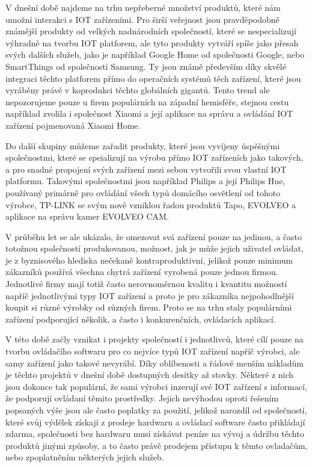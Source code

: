 V dnešní době najdeme na trhu nepřeberné množství produktů, které nám umožní interakci s IOT zařízeními. Pro širší veřejnost jsou pravděpodobně známější produkty od velkých nadnárodních společností, které se nespecializují výhradně na tvorbu IOT platforem, ale tyto produkty vytváří spíše jako přesah svých dalších služeb, jako je například Google Home od společnosti Google, nebo SmartThings od společnosti Samsung. Ty jsou známě především díky skvělé integraci těchto platforem přímo do operačních systémů těch zařízení, které jsou vyráběny právě v koprodukci těchto globálních gigantů. Tento trend ale nepozorujeme pouze u firem populárních na západní hemisféře, stejnou cestu například zvolila i společnost Xiaomi a její aplikace na správu a ovládání IOT zařízení pojmenovaná Xiaomi Home.

Do další skupiny můžeme zařadit produkty, které jsou vyvíjeny úspěšnými společnostmi, které se speializují na výrobu přímo IOT zařízeních jako takových, a pro snadné propojení svých zařízení mezi sebou vytvořili svou vlastní IOT platformu. Takovými společnostmi jsou například Philips a její Philips Hue, používaný primárně pro ovládání všech typů domácího osvětlení od tohoto výrobce, TP-LINK se svým nově vzniklou řadou produktů Tapo, EVOLVEO a aplikace na správu kamer EVOLVEO CAM.

V průběhu let se ale ukázalo, že omezovat svá zařízení pouze na jedinou, a často totožnou společností produkovanou, možnost, jak je může jejich uživatel ovládat, je z byznisového hlediska nečekaně kontraproduktivní, jelikož pouze minimum zákazníků používá všechna chytrá zařízení vyrobená pouze jednou firmou. Jednotlivé firmy mají totiž často nerovnoměrnou kvalitu i kvantitu možností napříč jednotlivými typy IOT zařízení a proto je pro zákazníka nejpohodlnější koupit si různé výrobky od různých firem. Proto se na trhu staly populárními zařízení podporující několik, a často i konkurenčních, ovládacích aplikací.

V této době začly vznikat i projekty společností i jednotlivců, které cílí pouze na tvorbu ovládačího softwaru pro co nejvíce typů IOT zařízení napříč výrobci, ale samy zařízení jako takové nevyrábí. Díky oblíbenosti a řádově menším nákladům je těchto projektů v dnešní době dostupných desítky až stovky. Některé z nich jsou dokonce tak populární, že sami výrobci inzerují své IOT zařízení s informací, že podporují ovládaní těmito prostředky. Jejich nevýhodou oproti řešením popsaných výše jsou ale často poplatky za použití, jelikož narozdíl od společností, které svůj výdělek získají z prodeje hardwaru a ovládací software často přikládají zdarma, společnosti bez hardwaru musí získávat peníze na vývoj a údržbu těchto produktů jinými způsoby, a to často právě prodejem přístupu k těmto ovladačům, nebo zpoplatněním některých jejich služeb.

